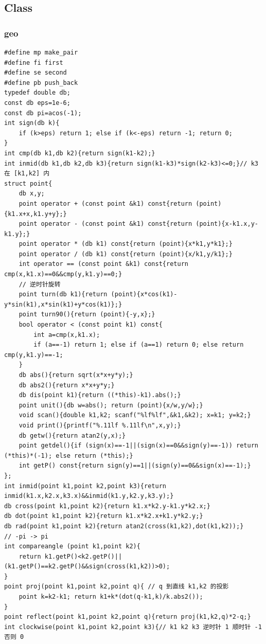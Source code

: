 \documentclass[twoside]{article}
\begin{document}
\subsection{Class}
\subsubsection{geo}
\begin{lstlisting}
#define mp make_pair
#define fi first
#define se second
#define pb push_back
typedef double db;
const db eps=1e-6;
const db pi=acos(-1);
int sign(db k){
    if (k>eps) return 1; else if (k<-eps) return -1; return 0;
}
int cmp(db k1,db k2){return sign(k1-k2);}
int inmid(db k1,db k2,db k3){return sign(k1-k3)*sign(k2-k3)<=0;}// k3 在 [k1,k2] 内 
struct point{
    db x,y;
    point operator + (const point &k1) const{return (point){k1.x+x,k1.y+y};}
    point operator - (const point &k1) const{return (point){x-k1.x,y-k1.y};}
    point operator * (db k1) const{return (point){x*k1,y*k1};}
    point operator / (db k1) const{return (point){x/k1,y/k1};}
    int operator == (const point &k1) const{return cmp(x,k1.x)==0&&cmp(y,k1.y)==0;}
    // 逆时针旋转 
    point turn(db k1){return (point){x*cos(k1)-y*sin(k1),x*sin(k1)+y*cos(k1)};}
    point turn90(){return (point){-y,x};}
    bool operator < (const point k1) const{
        int a=cmp(x,k1.x);
        if (a==-1) return 1; else if (a==1) return 0; else return cmp(y,k1.y)==-1;
    }
    db abs(){return sqrt(x*x+y*y);}
    db abs2(){return x*x+y*y;}
    db dis(point k1){return ((*this)-k1).abs();}
    point unit(){db w=abs(); return (point){x/w,y/w};}
    void scan(){double k1,k2; scanf("%lf%lf",&k1,&k2); x=k1; y=k2;}
    void print(){printf("%.11lf %.11lf\n",x,y);}
    db getw(){return atan2(y,x);} 
    point getdel(){if (sign(x)==-1||(sign(x)==0&&sign(y)==-1)) return (*this)*(-1); else return (*this);}
	int getP() const{return sign(y)==1||(sign(y)==0&&sign(x)==-1);}
};
int inmid(point k1,point k2,point k3){return inmid(k1.x,k2.x,k3.x)&&inmid(k1.y,k2.y,k3.y);}
db cross(point k1,point k2){return k1.x*k2.y-k1.y*k2.x;}
db dot(point k1,point k2){return k1.x*k2.x+k1.y*k2.y;}
db rad(point k1,point k2){return atan2(cross(k1,k2),dot(k1,k2));}
// -pi -> pi
int compareangle (point k1,point k2){
    return k1.getP()<k2.getP()||(k1.getP()==k2.getP()&&sign(cross(k1,k2))>0);
}
point proj(point k1,point k2,point q){ // q 到直线 k1,k2 的投影 
    point k=k2-k1; return k1+k*(dot(q-k1,k)/k.abs2());
}
point reflect(point k1,point k2,point q){return proj(k1,k2,q)*2-q;}
int clockwise(point k1,point k2,point k3){// k1 k2 k3 逆时针 1 顺时针 -1 否则 0  

\end{lstlisting}
\end{document}

